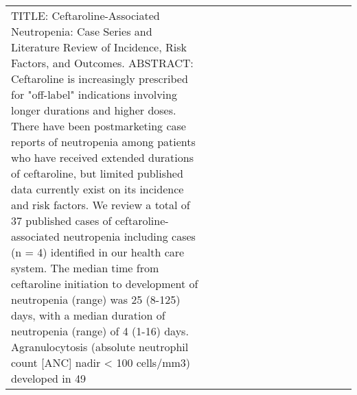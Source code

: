\begin{longtable}{llllllllllllll}
TITLE: Ceftaroline-Associated Neutropenia: Case Series and Literature Review of Incidence, Risk Factors, and Outcomes. ABSTRACT: Ceftaroline is increasingly prescribed for "off-label" indications involving longer durations and higher doses. There have been postmarketing case reports of neutropenia among patients who have received extended durations of ceftaroline, but limited published data currently exist on its incidence and risk factors. We review a total of 37 published cases of ceftaroline-associated neutropenia including cases (n = 4) identified in our health care system. The median time from ceftaroline initiation to development of neutropenia (range) was 25 (8-125) days, with a median duration of neutropenia (range) of 4 (1-16) days. Agranulocytosis (absolute neutrophil count [ANC] nadir < 100 cells/mm3) developed in 49%

\end{longtable}
